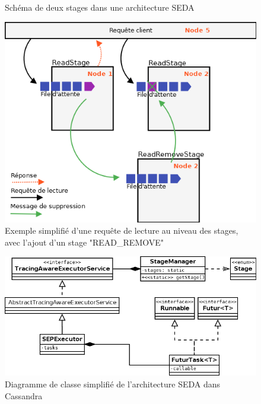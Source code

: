\documentclass[12pt]{article}
\begin{document}
\clearpage


\begin{figure}[p]
	\centering
		
	\caption{Schéma de deux stages dans une architecture SEDA \label{fig:stages}}
\end{figure}

\begin{figure}[p]
	\centering
		\includegraphics[width=15cm]{images/architecture/read_request.png}
	\caption{Exemple simplifié d'une requête de lecture au niveau des stages, avec l'ajout d'un stage "READ\_REMOVE" \label{fig:read_request}}
\end{figure}

\begin{figure}[p]
	\centering
		\includegraphics[width=15cm]{images/architecture/stages_diagram.png}
	\caption{Diagramme de classe simplifié de l'architecture SEDA dans Cassandra \label{fig:stages_diagram}}
\end{figure}
\end{document}
